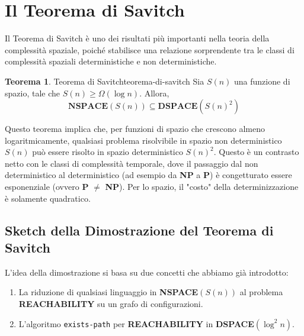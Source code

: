 \documentclass[a4paper]{article}
\theoremstyle{definition} %
\newtheorem{theorem}{Teorema}
\begin{document}
\section{Il Teorema di Savitch}
Il Teorema di Savitch è uno dei risultati più importanti nella teoria della complessità spaziale, poiché stabilisce una relazione sorprendente tra le classi di complessità spaziali deterministiche e non deterministiche.

\begin{theorem}{Teorema di Savitch}{teorema-di-savitch}
Sia $S(n)$ una funzione di spazio, tale che $S(n) \geq \Omega(\log n)$. Allora,
\[ \mathbf{NSPACE}(S(n)) \subseteq \mathbf{DSPACE}(S(n)^2) \]
\end{theorem}

Questo teorema implica che, per funzioni di spazio che crescono almeno logaritmicamente, qualsiasi problema risolvibile in spazio non deterministico $S(n)$ può essere risolto in spazio deterministico $S(n)^2$. Questo è un contrasto netto con le classi di complessità temporale, dove il passaggio dal non deterministico al deterministico (ad esempio da \textbf{NP} a \textbf{P}) è congetturato essere esponenziale (ovvero \textbf{P} $\ne$ \textbf{NP}). Per lo spazio, il "costo" della determinizzazione è solamente quadratico.

\subsection{Sketch della Dimostrazione del Teorema di Savitch}
L'idea della dimostrazione si basa su due concetti che abbiamo già introdotto:
\begin{enumerate}
    \item La riduzione di qualsiasi linguaggio in \textbf{NSPACE}$(S(n))$ al problema \textbf{REACHABILITY} su un grafo di configurazioni.
    \item L'algoritmo \texttt{exists-path} per \textbf{REACHABILITY} in \textbf{DSPACE}$(\log^2 n)$.
\end{enumerate}
\end{document}
